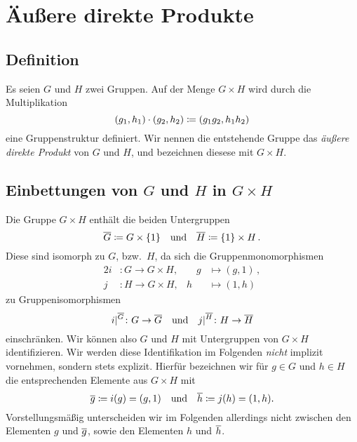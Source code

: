 \chapter{Äußere direkte Produkte}





\section{Definition}

Es seien $G$ und $H$ zwei Gruppen.
Auf der Menge $G \times H$ wird durch die Multiplikation
\[
          (g_1, h_1) \cdot (g_2, h_2)
  \coloneqq (g_1 g_2, h_1 h_2)
\]
eine Gruppenstruktur definiert.
Wir nennen die entstehende Gruppe das \emph{äußere direkte Produkt} von $G$ und $H$, und bezeichnen diesese mit $G \times H$.





\section{Einbettungen von \texorpdfstring{$G$}{G} und \texorpdfstring{$H$}{H} in \texorpdfstring{$G \times H$}{G x H}}

Die Gruppe $G \times H$ enthält die beiden Untergruppen
\[
          \overline{G}
  \coloneqq G \times \{1\}
  \quad\text{und}\quad
          \overline{H}
  \coloneqq \{1\} \times H \,.
\]
Diese sind isomorph zu $G$, bzw.\ $H$, da sich die Gruppenmonomorphismen
\begin{alignat*}{2}
            i
  &\colon   G
   \to      G \times H,
   &
   \quad    g
  &\mapsto  (g,1) \,,
  \\
            j
  &\colon   H
   \to      G \times H,
   &
            h
  &\mapsto (1,h)
\end{alignat*}
zu Gruppenisomorphismen
\[
        \restrict{i}{}[\induced{G}]
 \colon G
 \to    \induced{G}
 \quad\text{und}\quad
        \restrict{j}{}[\induced{H}]
 \colon H
 \to    \induced{H}
\]
einschränken.
Wir können also $G$ und $H$ mit Untergruppen von $G \times H$ identifizieren.
Wir werden diese Identifikation im Folgenden \emph{nicht} implizit vornehmen, sondern stets explizit.
Hierfür bezeichnen wir für $g \in G$ und $h \in H$ die entsprechenden Elemente aus $G \times H$ mit
\[
          \overline{g}
  \coloneqq i(g)
  =       (g,1)
  \quad\text{und}\quad
          \overline{h}
  \coloneqq j(h)
  =       (1,h).
\]
Vorstellungsmäßig unterscheiden wir im Folgenden allerdings nicht zwischen den Elementen $g$ und $\overline{g}$, sowie den Elementen $h$ und $\overline{h}$.





